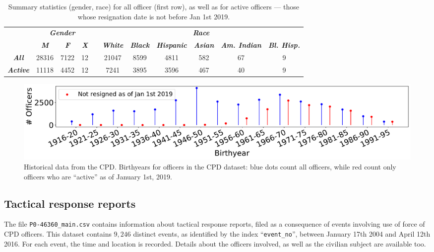 \begin{table}[h]
\begin{tabular}{l|c|c|c|c|c|c|c|c|c|c|}
\cline{2-4} \cline{6-11}
                                               & \multicolumn{3}{c|}{\textit{\textbf{Gender}}}                   & \multicolumn{1}{l|}{} & \multicolumn{6}{c|}{\textit{\textbf{Race}}}                                                                                                                           \\ \cline{2-4} \cline{6-11} 
                                               & \textit{\textbf{M}} & \textit{\textbf{F}} & \textit{\textbf{X}} &                       & \textit{\textbf{White}} & \textit{\textbf{Black}} & \textit{\textbf{Hispanic}} & \textit{\textbf{Asian}} & \textit{\textbf{Am. Indian}} & \textit{\textbf{Bl. Hisp.}} \\ \cline{1-4} \cline{6-11} 
\multicolumn{1}{|c|}{\textit{\textbf{All}}}    & 28316               & 7122                & 12                  &                       & 21047                   & 8599                    & 4811                       & 582                     & 67                           & 9                           \\ \cline{1-4} \cline{6-11} 
\multicolumn{1}{|c|}{\textit{\textbf{Active}}} & 11118               & 4452                & 12                  &                       & 7241                    & 3895                    & 3596                       & 467                     & 40                           & 9                           \\ \cline{1-4} \cline{6-11} 
\end{tabular}
\caption{Summary statistics (gender, race) for all officer (first row), as well as for active officers --- those whose resignation date is not before Jan 1st 2019.} \label{tab:stats}
\end{table}

\begin{figure}[h] 
	\includegraphics[width=\textwidth]{figs/history_by} 
	\caption{Historical data from the CPD. Birthyears for officers in the CPD dataset: blue dots count all officers, while red count only officers who are ``active'' as of January 1st, 2019.} \label{fig:history_by}
\end{figure}

\subsection{Tactical response reports}

The file \texttt{P0-46360\_main.csv} contains information about tactical response reports, filed as a consequence of  events involving use of force of CPD officers. This dataset contains $9{,}246$ distinct events, as identified by the index ``\texttt{event\_no}'', between January 17th 2004 and April 12th 2016. For each event, the time and location is recorded. Details about the officers involved, as well as the civilian subject are available too. 